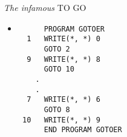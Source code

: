 \begin{frame}[fragile]{\textit{The infamous} TO GO}  
 \begin{itemize}[<+(0)->]
  \item [] 
   \begin{verbatim}
      PROGRAM GOTOER
  1   WRITE(*, *) 0
      GOTO 2
  9   WRITE(*, *) 8
      GOTO 10
    .
    .
  7   WRITE(*, *) 6
      GOTO 8
 10   WRITE(*, *) 9
      END PROGRAM GOTOER
   \end{verbatim}
 \end{itemize}
\end{frame}